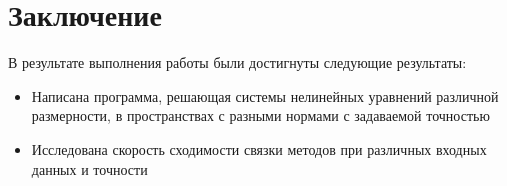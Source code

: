 \documentclass[a4paper, 12pt]{article}
\begin{document}
\section*{Заключение}
В результате выполнения работы были достигнуты следующие результаты:\\
\begin{itemize}
	\item Написана программа, решающая системы нелинейных уравнений различной размерности, в пространствах с разными нормами с задаваемой точностью
	\item Исследована скорость сходимости связки методов при различных входных данных и точности
\end{itemize}
\newpage
{}
\nocite{nm_verg_a}
\nocite{nm_verg_m}
\nocite{RH}
\nocite{RS}

\end{document}
